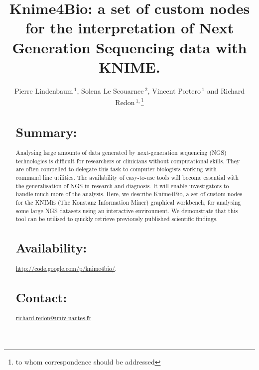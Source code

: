 \documentclass{bioinfo}
\begin{document}

\title[Knime4Bio]{Knime4Bio: a set of custom nodes for the interpretation of Next Generation Sequencing data with KNIME.}
\author[Pierre Lindenbaum \textit{et~al}]{Pierre Lindenbaum\,$^{1}$, Solena Le Scouarnec\,$^{2}$,  Vincent Portero\,$^{1}$ and Richard Redon\,$^{1,}$\footnote{to whom correspondence should be addressed}}
\address{$^{1}$Institut du thorax, Inserm UMR 915, Centre Hospitalier Universitaire de Nantes, 44000 Nantes, France.\\
$^{2}$The Wellcome Trust Sanger Institute, Hinxton, Cambridge CB10 1SA, UK.}



\maketitle

\begin{abstract}

\section{Summary:}
Analysing large amounts of data generated by next-generation sequencing (NGS) technologies is difficult for researchers or clinicians without computational skills. They are often compelled to delegate this task to computer biologists working with command line utilities. The availability of easy-to-use tools will become essential with the generalisation of NGS in research and diagnosis. It will enable investigators to handle much more of the analysis. Here, we describe Knime4Bio, a set of custom nodes for the KNIME (The Konstanz Information Miner) graphical workbench, for analysing some large NGS datasets using an interactive environment. We demonstrate that this tool can be utilised to quickly retrieve previously published scientific findings.

\section{Availability:}
\href{http://code.google.com/p/knime4bio/}{http://code.google.com/p/knime4bio/}.

\section{Contact:} \href{mailto:richard.redon@univ-nantes.fr}{richard.redon@univ-nantes.fr}
\end{abstract}
\end{document}
